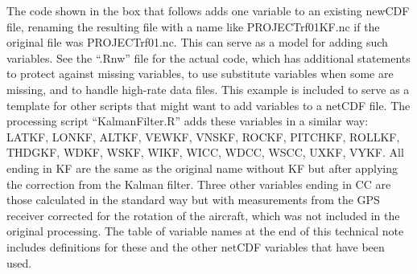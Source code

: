 \documentclass[12pt,twoside,english,12pt,twoside,english]{article}\usepackage[]{graphicx}\usepackage[]{color}
\let\OrgIndex\index
\renewcommand*{\index}[1]{\OrgIndex{#1}}
\begin{document}
The code shown in the box that follows adds one
variable to an existing newCDF file,
renaming the resulting file with a name like PROJECTrf01KF.nc if the
original file was PROJECTrf01.nc. This can serve as a model
for adding such variables. See the ``.Rnw'' file
for the actual code, which has additional statements to protect against
missing variables, to use substitute variables when some are missing,
and to handle high-rate data files. This example
is included to serve as a template for other scripts that might want
to add variables to a netCDF file. The processing script ``KalmanFilter.R''
adds these variables in a similar way: LATKF,
LONKF, ALTKF,
VEWKF, VNSKF,
ROCKF, PITCHKF,
ROLLKF, THDGKF,
WDKF, WSKF,
WIKF, WICC,
WDCC, WSCC,
UXKF, VYKF.
All ending in KF are the same as the original name without KF but
after applying the correction from the Kalman filter. Three other
variables ending in CC are those calculated in the standard way but
with measurements from the GPS receiver corrected for the rotation
of the aircraft, which was not included in the original processing.
The table of variable names at the end of this technical note includes
definitions for these and the other netCDF variables that have been
used.
\end{document}
